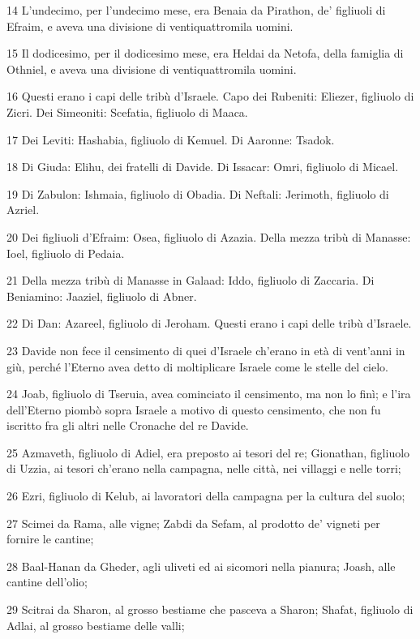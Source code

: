 \par 14 L'undecimo, per l'undecimo mese, era Benaia da Pirathon, de' figliuoli di Efraim, e aveva una divisione di ventiquattromila uomini.
\par 15 Il dodicesimo, per il dodicesimo mese, era Heldai da Netofa, della famiglia di Othniel, e aveva una divisione di ventiquattromila uomini.
\par 16 Questi erano i capi delle tribù d'Israele. Capo dei Rubeniti: Eliezer, figliuolo di Zicri. Dei Simeoniti: Scefatia, figliuolo di Maaca.
\par 17 Dei Leviti: Hashabia, figliuolo di Kemuel. Di Aaronne: Tsadok.
\par 18 Di Giuda: Elihu, dei fratelli di Davide. Di Issacar: Omri, figliuolo di Micael.
\par 19 Di Zabulon: Ishmaia, figliuolo di Obadia. Di Neftali: Jerimoth, figliuolo di Azriel.
\par 20 Dei figliuoli d'Efraim: Osea, figliuolo di Azazia. Della mezza tribù di Manasse: Ioel, figliuolo di Pedaia.
\par 21 Della mezza tribù di Manasse in Galaad: Iddo, figliuolo di Zaccaria. Di Beniamino: Jaaziel, figliuolo di Abner.
\par 22 Di Dan: Azareel, figliuolo di Jeroham. Questi erano i capi delle tribù d'Israele.
\par 23 Davide non fece il censimento di quei d'Israele ch'erano in età di vent'anni in giù, perché l'Eterno avea detto di moltiplicare Israele come le stelle del cielo.
\par 24 Joab, figliuolo di Tseruia, avea cominciato il censimento, ma non lo finì; e l'ira dell'Eterno piombò sopra Israele a motivo di questo censimento, che non fu iscritto fra gli altri nelle Cronache del re Davide.
\par 25 Azmaveth, figliuolo di Adiel, era preposto ai tesori del re; Gionathan, figliuolo di Uzzia, ai tesori ch'erano nella campagna, nelle città, nei villaggi e nelle torri;
\par 26 Ezri, figliuolo di Kelub, ai lavoratori della campagna per la cultura del suolo;
\par 27 Scimei da Rama, alle vigne; Zabdi da Sefam, al prodotto de' vigneti per fornire le cantine;
\par 28 Baal-Hanan da Gheder, agli uliveti ed ai sicomori nella pianura; Joash, alle cantine dell'olio;
\par 29 Scitrai da Sharon, al grosso bestiame che pasceva a Sharon; Shafat, figliuolo di Adlai, al grosso bestiame delle valli;

